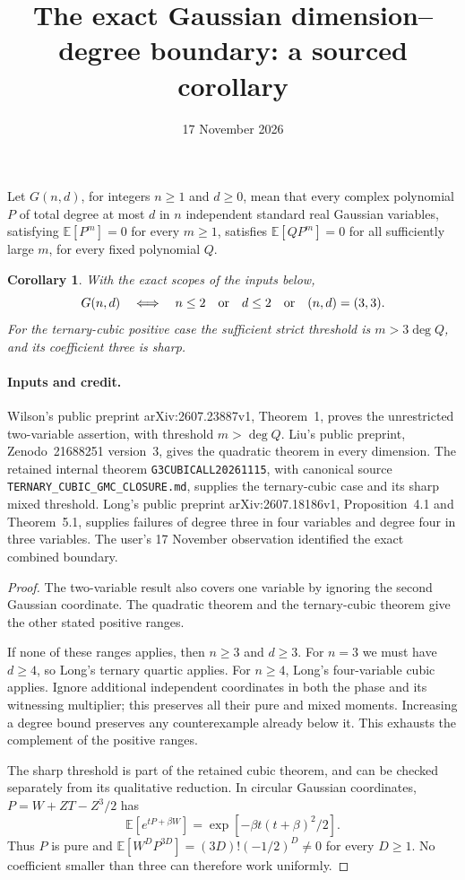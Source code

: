 \documentclass[11pt]{article}
\newtheorem{corollary}{Corollary}
\begin{document}
\title{The exact Gaussian dimension--degree boundary: a sourced corollary}
\author{}\date{17 November 2026}\maketitle

Let $G(n,d)$, for integers $n\geq1$ and $d\geq0$, mean that every
complex polynomial $P$ of total degree at most $d$ in $n$ independent
standard real Gaussian variables, satisfying $\mathbb E[P^m]=0$ for
every $m\geq1$, satisfies $\mathbb E[QP^m]=0$ for all sufficiently
large $m$, for every fixed polynomial $Q$.

\begin{corollary}
With the exact scopes of the inputs below,
\[
 G(n,d)\quad\Longleftrightarrow\quad
 n\leq2\quad\hbox{or}\quad d\leq2\quad\hbox{or}\quad(n,d)=(3,3).
\]
For the ternary-cubic positive case the sufficient strict threshold is
$m>3\deg Q$, and its coefficient three is sharp.
\end{corollary}

\paragraph{Inputs and credit.}
Wilson's public preprint arXiv:2607.23887v1, Theorem~1, proves the
unrestricted two-variable assertion, with threshold $m>\deg Q$.
Liu's public preprint, Zenodo~21688251 version~3, gives the quadratic
theorem in every dimension. The retained internal theorem
\texttt{G3CUBICALL20261115}, with canonical source
\texttt{TERNARY\_CUBIC\_GMC\_CLOSURE.md}, supplies the ternary-cubic
case and its sharp mixed threshold. Long's public preprint
arXiv:2607.18186v1, Proposition~4.1 and Theorem~5.1, supplies failures
of degree three in four variables and degree four in three variables.
The user's 17 November observation identified the exact combined boundary.

\begin{proof}
The two-variable result also covers one variable by ignoring the second
Gaussian coordinate. The quadratic theorem and the ternary-cubic theorem
give the other stated positive ranges.

If none of these ranges applies, then $n\geq3$ and $d\geq3$.
For $n=3$ we must have $d\geq4$, so Long's ternary quartic applies.
For $n\geq4$, Long's four-variable cubic applies. Ignore additional
independent coordinates in both the phase and its witnessing multiplier;
this preserves all their pure and mixed moments. Increasing a degree
bound preserves any counterexample already below it. This exhausts
the complement of the positive ranges.

The sharp threshold is part of the retained cubic theorem, and can be
checked separately from its qualitative reduction. In circular Gaussian
coordinates, $P=W+ZT-Z^3/2$ has
\[
 \mathbb E[e^{tP+\beta W}]
   =\exp[-\beta t(t+\beta)^2/2].
\]
Thus $P$ is pure and
$\mathbb E[W^D P^{3D}]=(3D)!(-1/2)^D\ne0$ for every $D\geq1$.
No coefficient smaller than three can therefore work uniformly.
\end{proof}
\end{document}
